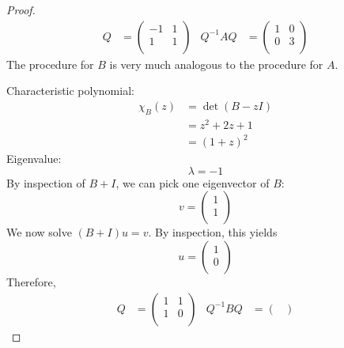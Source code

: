 \documentclass[../psets.tex]{subfiles}
\begin{document}
\begin{enumerate}
\begin{proof}
\begin{align*}
            Q &=
            \begin{pmatrix}
                -1 & 1\\
                1 & 1\\
            \end{pmatrix}&
            Q^{-1}AQ &=
            \begin{pmatrix}
                1 & 0\\
                0 & 3\\
            \end{pmatrix}
        \end{align*}
        The procedure for $B$ is very much analogous to the procedure for $A$.\par
        Characteristic polynomial:
        \begin{align*}
            \chi_B(z) &= \det(B-zI)\\
            &= z^2+2z+1\\
            &= (1+z)^2
        \end{align*}
        Eigenvalue:
        \begin{equation*}
            \lambda = -1
        \end{equation*}
        By inspection of $B+I$, we can pick one eigenvector of $B$:
        \begin{equation*}
            v =
            \begin{pmatrix}
                1\\
                1\\
            \end{pmatrix}
        \end{equation*}
        We now solve $(B+I)u=v$. By inspection, this yields
        \begin{equation*}
            u =
            \begin{pmatrix}
                1\\
                0\\
            \end{pmatrix}
        \end{equation*}
        Therefore,
        \begin{align*}
            Q &=
            \begin{pmatrix}
                1 & 1\\
                1 & 0\\
            \end{pmatrix}&
            Q^{-1}BQ &=
            \begin{pmatrix}

\end{pmatrix}
\end{align*}
\end{proof}
\end{enumerate}
\end{document}
